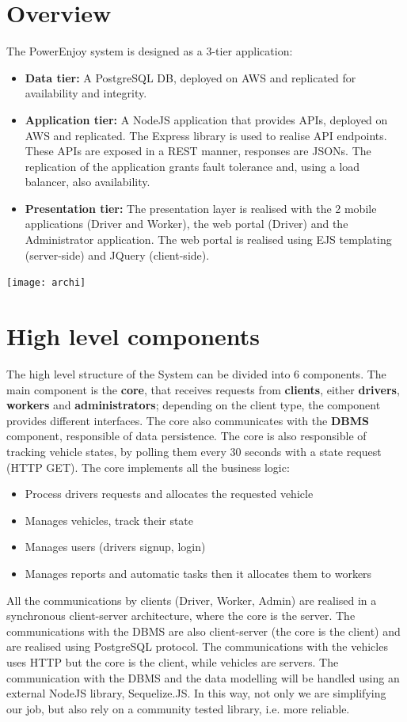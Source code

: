 \section{Overview}
The PowerEnjoy system is designed as a 3-tier application:
\begin{itemize}
\item \textbf{Data tier:} A PostgreSQL DB, deployed on AWS and replicated for availability and integrity. 
\item \textbf{Application tier:} A NodeJS application that provides APIs, deployed on AWS and replicated. The Express library is used to realise API endpoints. These APIs are exposed in a REST manner, responses are JSONs. The replication of the application grants fault tolerance and, using a load balancer, also availability.
\item \textbf{Presentation tier:} The presentation layer is realised with the 2 mobile applications (Driver and Worker), the web portal (Driver) and the Administrator application. The web portal is realised using EJS templating (server-side) and JQuery (client-side).
\end{itemize}
\texttt{[image: archi]}
\newpage
\section{High level components}
The high level structure of the System can be divided into 6 components. The main component is the \textbf{core}, that receives requests from \textbf{clients}, either \textbf{drivers}, \textbf{workers} and \textbf{administrators}; depending on the client type, the component provides different interfaces. 
The core also communicates with the \textbf{DBMS} component, responsible of data persistence. 
The core is also responsible of tracking vehicle states, by polling them every 30 seconds with a state request (HTTP GET).
The core implements all the business logic: 
\begin{itemize}
\item Process drivers requests and allocates the requested vehicle 
\item Manages vehicles, track their state
\item Manages users (drivers signup, login)
\item Manages reports and automatic tasks then it allocates them to workers
\end{itemize}
All the communications by clients (Driver, Worker, Admin) are realised in a synchronous client-server architecture, where the core is the server. The communications with the DBMS are also client-server (the core is the client) and are realised using PostgreSQL protocol. The communications with the vehicles uses HTTP but the core is the client, while vehicles are servers.
The communication with the DBMS and the data modelling will be handled using an external NodeJS library, Sequelize.JS. In this way, not only we are simplifying our job, but also rely on a community tested library, i.e. more reliable.

